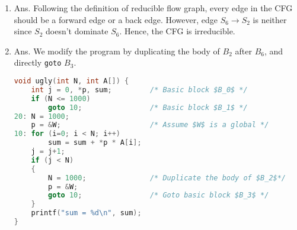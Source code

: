 \documentclass[11pt]{homework}
\begin{document}
\begin{enumerate}[label=(\alph*)]
\item Ans. Following the definition of reducible flow graph,
every edge in the CFG should be a forward edge or a back edge.
However, edge $S_6 \to S_2$ is neither since $S_2$ doesn't dominate $S_6$.
Hence, the CFG is irreducible.

\item Ans. We modify the program by duplicating the body of $B_2$ after $B_6$,
and directly \texttt{goto} $B_3$.
\begin{lstlisting}[language=C]
void ugly(int N, int A[]) {
    int j = 0, *p, sum;         /* Basic block $B_0$ */
    if (N <= 1000)
        goto 10;                /* Basic block $B_1$ */
20: N = 1000;
    p = &W;                     /* Assume $W$ is a global */
10: for (i=0; i < N; i++)
        sum = sum + *p * A[i];
    j = j+1;
    if (j < N)
    {
        N = 1000;               /* Duplicate the body of $B_2$*/
        p = &W;
        goto 10;                /* Goto basic block $B_3$ */
    }
    printf("sum = %d\n", sum);
}
\end{lstlisting}

\end{enumerate}

\question
\end{document}
